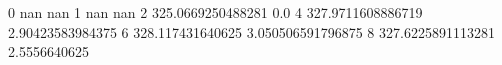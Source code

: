 0 nan nan
1 nan nan
2 325.0669250488281 0.0
4 327.9711608886719 2.90423583984375
6 328.117431640625 3.050506591796875
8 327.6225891113281 2.5556640625
